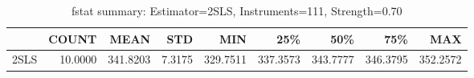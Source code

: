 \begin{table}[ht]
\centering
\caption{fstat summary: Estimator=2SLS, Instruments=111, Strength=0.70}
\begin{tabular}{lrrrrrrrr}
\toprule
 & COUNT & MEAN & STD & MIN & 25\% & 50\% & 75\% & MAX \\
\midrule
2SLS & 10.0000 & 341.8203 & 7.3175 & 329.7511 & 337.3573 & 343.7777 & 346.3795 & 352.2572 \\
\bottomrule
\end{tabular}
\end{table}
